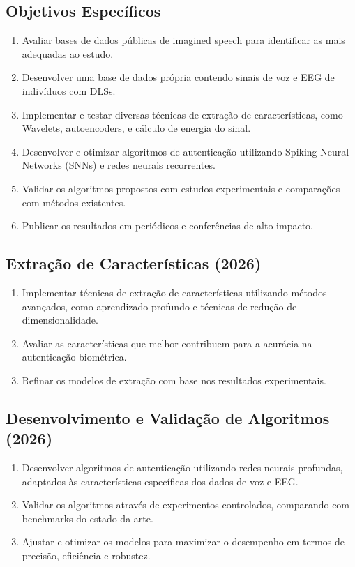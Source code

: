 		\subsection{Objetivos Específicos}
		\begin{enumerate}
			\item Avaliar bases de dados públicas de imagined speech para identificar as mais adequadas ao estudo.
			\item Desenvolver uma base de dados própria contendo sinais de voz e EEG de indivíduos com DLSs.
			\item Implementar e testar diversas técnicas de extração de características, como Wavelets, autoencoders, e cálculo de energia do sinal.
			\item Desenvolver e otimizar algoritmos de autenticação utilizando Spiking Neural Networks (SNNs) e redes neurais recorrentes.
			\item Validar os algoritmos propostos com estudos experimentais e comparações com métodos existentes.
			\item Publicar os resultados em periódicos e conferências de alto impacto.
		\end{enumerate}
	
		\subsection{Extração de Características (2026)}
		
		\begin{enumerate}
			\item Implementar técnicas de extração de características utilizando métodos avançados, como aprendizado profundo e técnicas de redução de dimensionalidade.
			\item Avaliar as características que melhor contribuem para a acurácia na autenticação biométrica.
			\item Refinar os modelos de extração com base nos resultados experimentais.
		\end{enumerate}
		
		\subsection{Desenvolvimento e Validação de Algoritmos (2026)}
		
		\begin{enumerate}
			\item Desenvolver algoritmos de autenticação utilizando redes neurais profundas, adaptados às características específicas dos dados de voz e EEG.
			\item Validar os algoritmos através de experimentos controlados, comparando com benchmarks do estado-da-arte.
			\item Ajustar e otimizar os modelos para maximizar o desempenho em termos de precisão, eficiência e robustez.
		\end{enumerate}
	
